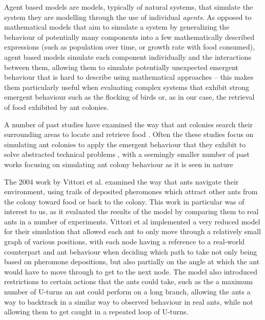 
    Agent based models are models, typically of natural systems, that simulate the system they are modelling through the use of individual \textit{agents}. As opposed to mathematical models that aim to simulate
    a system by generalizing the behaviour of potentially many components into a few mathematically described expressions (such as population over time, or growth rate with food consumed), agent based models simulate
    each component individually and the interactions between them\cite{8}, allowing them to simulate potentially unexpected emergent behaviour that is hard to describe using mathematical approaches -- this makes them
    particularly useful when evaluating complex systems that exhibit strong emergent behaviour such as the flocking of birds or, as in our case, the retrieval of food exhibited by ant colonies.
    
    A number of past studies have examined the way that ant colonies search their surrounding areas to locate and retrieve food \cite{vittori_modeling_2004, a_panait_ant_2004}.
    Often the these studies focus on simulating ant colonies to apply the emergent behaviour that they exhibit to solve abstracted technical
    problems \cite{dorigo_ant_2006, zhang_improved_2007}, with a seemingly smaller number of past works focusing on simulating ant colony behaviour as it is seen in nature \cite{vittori_modeling_2004} %
    

    The 2004 work by Vittori et al.\cite{vittori_modeling_2004} examined the way that ants navigate their environment, using trails of deposited pheromones which attract other ants from the colony toward food or back
    to the colony. This work in particular was of interest to us, as it evaluated the results of the model by comparing them to real ants in a number of experiments. Vittori et al implemented a very reduced model for
    their simulation that allowed each ant to only move through a relatively small graph of various positions, with each node having a reference to a real-world counterpart and ant behaviour when deciding
    which path to take not only being based on pheromone depositions, but also partially on the angle at which the ant would have to move through to get to the next node. The model also introduced restrictions to
    certain actions that the ants could take, such as the a maximum number of U-turns an ant could perform on a long branch, allowing the ants a way to backtrack in a similar way to observed behaviour in real ants, while 
    not allowing them to get caught in a repeated loop of U-turns.

